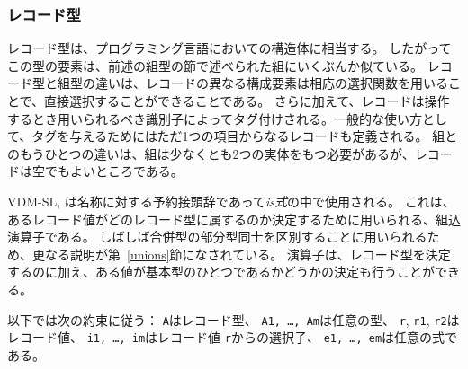 \documentclass[\pformat,12pt]{jarticle}
\newcommand{\vdmslpp}[2]{%
#1
}
\newcommand{\vdmsl}{VDM-SL}
\newcommand{\vdmpp}{VDM++}
\begin{document}
\subsubsection{レコード型}\label{records}

レコード型は、プログラミング言語においての構造体に相当する。
したがってこの型の要素は、前述の組型の節で述べられた組にいくぶんか似ている。
レコード型と組型の違いは、レコードの異なる構成要素は相応の選択関数を用いることで、直接選択することができることである。 
さらに加えて、レコードは操作するとき用いられるべき識別子によってタグ付けされる。一般的な使い方として、タグを与えるためにはただ1つの項目からなるレコードも定義される。
組とのもうひとつの違いは、組は少なくとも2つの実体をもつ必要があるが、レコードは空でもよいところである。

\vdmslpp{\vdmsl,}{\vdmpp,}  は名称に対する予約接頭辞であって{\it is式}の中で使用される。 
これは、あるレコード値がどのレコード型に属するのか決定するために用いられる、組込演算子である。
しばしば合併型の部分型同士を区別することに用いられるため、更なる説明が第~\ref{unions}節になされている。 
演算子は、レコード型を決定するのに加え、ある値が基本型のひとつであるかどうかの決定も行うことができる。
 
以下では次の約束に従う： {\tt A}はレコード型、 {\tt A1, \ldots, Am}は任意の型、 {\tt r}, {\tt r1}, {\tt r2}はレコード値、 {\tt i1, \ldots, im}はレコード値 {\tt r}からの選択子、 {\tt e1, \ldots, em}は任意の式である。
\end{document}
